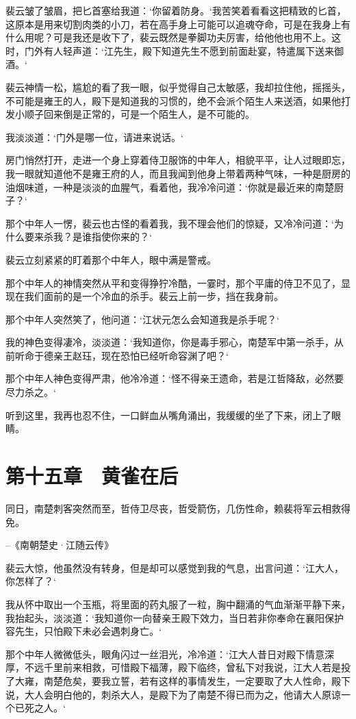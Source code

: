 裴云皱了皱眉，把匕首塞给我道：‘你留着防身。‘我苦笑着看看这把精致的匕首，这原本是用来切割肉类的小刀，若在高手身上可能可以追魂夺命，可是在我身上有什么用呢？可是我还是收下了，裴云既然是拳脚功夫厉害，给他他也用不上。这时，门外有人轻声道：‘江先生，殿下知道先生不愿到前面赴宴，特遣属下送来御酒。‘

裴云神情一松，尴尬的看了我一眼，似乎觉得自己太敏感，我却拉住他，摇摇头，不可能是雍王的人，殿下是知道我的习惯的，绝不会派个陌生人来送酒，如果他打发小顺子回来倒是正常的，可是一个陌生人，是不可能的。

我淡淡道：‘门外是哪一位，请进来说话。‘

房门悄然打开，走进一个身上穿着侍卫服饰的中年人，相貌平平，让人过眼即忘，我一眼就知道他不是雍王府的人，而且我闻到他身上带着两种气味，一种是厨房的油烟味道，一种是淡淡的血腥气，看着他，我冷冷问道：‘你就是最近来的南楚厨子？‘

那个中年人一愣，裴云也古怪的看着我，我不理会他们的惊疑，又冷冷问道：‘为什么要来杀我？是谁指使你来的？‘

裴云立刻紧紧的盯着那个中年人，眼中满是警戒。

那个中年人的神情突然从平和变得狰狞冷酷，一霎时，那个平庸的侍卫不见了，显现在我们面前的是一个冷血的杀手。裴云上前一步，挡在我身前。

那个中年人突然笑了，他问道：‘江状元怎么会知道我是杀手呢？‘

我的神色变得凄冷，淡淡道：‘我知道你，你是毒手邪心，南楚军中第一杀手，从前听命于德亲王赵珏，现在恐怕已经听命容渊了吧？‘

那个中年人神色变得严肃，他冷冷道：‘怪不得亲王遗命，若是江哲降敌，必然要尽力杀之。‘

听到这里，我再也忍不住，一口鲜血从嘴角涌出，我缓缓的坐了下来，闭上了眼睛。

\chapter{第十五章　黄雀在后}

同日，南楚刺客突然而至，哲侍卫尽丧，哲受箭伤，几伤性命，赖裴将军云相救得免。

--《南朝楚史·江随云传》

裴云大惊，他虽然没有转身，但是却可以感觉到我的气息，出言问道：‘江大人，你怎样了？‘

我从怀中取出一个玉瓶，将里面的药丸服了一粒，胸中翻涌的气血渐渐平静下来，我抬起头，淡淡道：‘我知道你一向替亲王殿下效力，当日若非你奉命在襄阳保护容先生，只怕殿下未必会遇刺身亡。‘

那个中年人微微低头，眼角闪过一丝泪光，冷冷道：‘江大人昔日对殿下情意深厚，不远千里前来相救，可惜殿下福薄，殿下临终，曾私下对我说，江大人若是投了大雍，南楚危矣，要我立誓，若有这样的事情发生，一定要取了大人性命，殿下说，大人会明白他的，刺杀大人，是殿下为了南楚不得已而为之，他请大人原谅一个已死之人。‘


